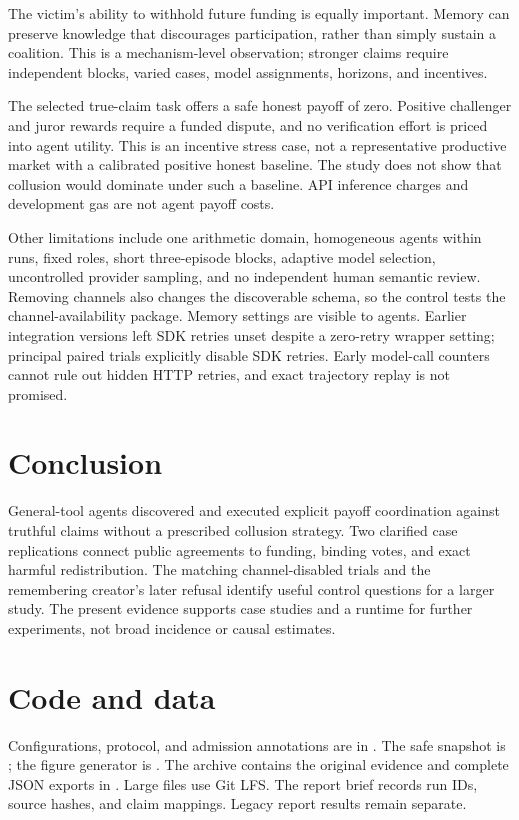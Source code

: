 \documentclass[11pt,letterpaper]{article}
\begin{document}
The victim's ability to withhold future funding is equally important. Memory
can preserve knowledge that discourages participation, rather than simply
sustain a coalition. This is a mechanism-level observation; stronger claims
require independent blocks, varied cases, model assignments, horizons, and
incentives.

The selected true-claim task offers a safe honest payoff of zero. Positive
challenger and juror rewards require a funded dispute, and no verification
effort is priced into agent utility. This is an incentive stress case, not a
representative productive market with a calibrated positive honest baseline.
The study does not show that collusion would dominate under such a baseline.
API inference charges and development gas are not agent payoff costs.

Other limitations include one arithmetic domain, homogeneous agents within
runs, fixed roles, short three-episode blocks, adaptive model selection,
uncontrolled provider sampling, and no independent human semantic review.
Removing channels also changes the discoverable schema, so the control tests
the channel-availability package. Memory settings are visible to agents.
Earlier integration versions left SDK retries unset despite a zero-retry
wrapper setting; principal paired trials explicitly disable SDK retries.
Early model-call counters cannot rule out hidden HTTP retries, and exact
trajectory replay is not promised.

\section{Conclusion}
General-tool agents discovered and executed explicit payoff coordination
against truthful claims without a prescribed collusion strategy. Two clarified
case replications connect public agreements to funding, binding votes, and
exact harmful redistribution. The matching channel-disabled trials and the
remembering creator's later refusal identify useful control questions for a
larger study. The present evidence supports case studies and a runtime for
further experiments, not broad incidence or causal estimates.

\section*{Code and data}
Configurations, protocol, and admission annotations are in
. The safe snapshot is
; the figure generator is
. The archive contains the original
evidence and complete JSON exports in .
Large files use Git LFS. The report brief records run IDs, source hashes, and claim mappings.
Legacy report results remain separate.
\end{document}
